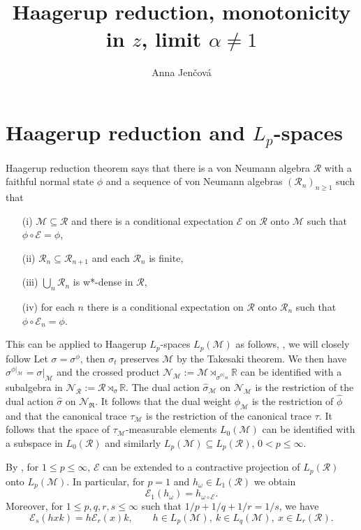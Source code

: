 \documentclass[12pt]{article}
\title{Haagerup reduction, monotonicity in  $z$, limit $\alpha\ne 1$}
\author{Anna Jen\v cov\'a}
\theoremstyle{definition}
\theoremstyle{remark}
\def\Me{\mathcal M}
\def\Ee{\mathcal E}
\def\Ra{\mathcal R}
\def\Ne{\mathcal N}
\begin{document}
\maketitle


\section{Haagerup reduction and $L_p$-spaces}


Haagerup reduction theorem \cite[Thm. 2.1]{haagerup2010areduction} says that there is a
von Neumann algebra $\mathcal R$ with a faithful normal state $\phi$ and a sequence of von
Neumann algebras $(\Ra_n)_{n\ge 1}$ such that
\begin{enumerate}
\item[(i)] $\Me\subseteq \Ra$ and there is a conditional expectation $\Ee$ on $\Ra$ onto
$\Me$ such that $\phi\circ\Ee=\phi$,
\item[(ii)] $\Ra_n\subseteq \Ra_{n+1}$ and each $\Ra_n$ is finite,
\item[(iii)] $\bigcup_n \Ra_n$ is w*-dense in $\Ra$,
\item[(iv)] for each $n$ there is a conditional expectation on $\Ra$ onto $\Ra_n$ such
that $\phi\circ\Ee_n=\phi$.
\end{enumerate}

This can be applied to Haagerup $L_p$-spaces $L_p(\Me)$ as follows, \cite[Thm.
3.1]{haagerup2010areduction}, we will closely follow \cite[Sec. 2]{junge2003noncommutative} Let $\sigma=\sigma^\phi$, then $\sigma_t$ preserves $\Me$ by
the Takesaki theorem. We then have $\sigma^{\phi|_\Me}=\sigma|_\Me$ and the crossed
product $\Ne_\Me:=\Me\rtimes_{\sigma^{\phi|_\Me}} \mathbb R$ can be identified with a subalgebra in 
$\Ne_\Ra:=\Ra\rtimes_\sigma \mathbb R$. The dual action $\hat \sigma_\Me$ on $\Ne_\Me$ is
the restriction of the dual action $\hat\sigma$ on $\Ne_\Re$. It follows that the dual
weight $\hat\phi_\Me$ is the restriction of $\hat\phi$ and that the canonical trace
$\tau_\Me$ is the restriction of the canonical trace $\tau$. It follows that the space
of $\tau_\Me$-measurable elements $L_0(\Me)$ can be identified with a subspace in
$L_0(\Ra)$ and similarly $L_p(\Me)\subseteq L_p(\Ra)$, $0<p\le \infty$. 

By \cite[Prop. 2.3]{junge2003noncommutative}, for $1\le p\le \infty$, $\Ee$ can be
extended to a contractive projection of  $L_p(\Ra)$ onto $L_p(\Me)$. In particular, for
$p=1$ and $h_\omega\in L_1(\Ra)$ we obtain
\[
\Ee_1(h_\omega)=h_{\omega\circ\Ee}.
\]
Moreover, for $1\le p,q,r,s\le \infty$ such that $1/p+1/q+1/r=1/s $, we have  
\[
\Ee_s(hxk)=h\Ee_r(x)k,\qquad h\in
L_p(\Me), \ k\in L_q(\Me), \ x\in L_r(\Ra).
\]
\end{document}
